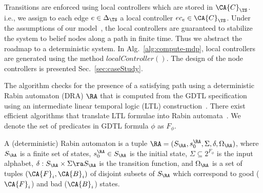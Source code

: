 Transitions are enforced using local controllers which are stored
in $\CA{C}_\TS$. i.e., we assign to each edge
$e \in \Delta_\TS$ a local controller $ec_e \in \CA{C}_\TS$.
Under the assumptions of our model~\cite{Agha14}, the local controllers
are guaranteed to stabilize the system to belief nodes along a path in finite time.
Thus we abstract the roadmap to a deterministic system.
In Alg.~\ref{alg:compute-mdp}, local controllers are generated
using the method $localController()$.
The design of the node controllers is presented Sec.~\ref{sec:caseStudy}. 

The algorithm checks for the presence of a satisfying path using
a deterministic Rabin automaton (DRA) $\RA$ that is computed from
the GDTL specification using an intermediate linear temporal logic (LTL)
construction~\cite{JonesDTL2013}.
There exist efficient algorithms that translate LTL formulae into Rabin automata~\cite{klein2006}.
We denote the set of predicates in GDTL formula $\phi$ as $F_\phi$.

\begin{definition}
A (deterministic) Rabin automaton is a tuple $\RA = (S_\RA, s_0^\RA, \Sigma, \delta, \Omega_\RA)$, where %
$S_\RA$ is a finite set of states, $s_0^\RA \in S_\RA$ is the initial state,
$\Sigma\subseteq 2^{F_\phi}$ is the input alphabet,
$\delta : S_\RA \times \Sigma \ra S_\RA$ is the transition function, and
$\Omega_\RA$ is a set of tuples $(\CA{F}_i, \CA{B}_i)$ of disjoint subsets
of $S_\RA$ which correspond to good ($\CA{F}_i$) and bad ($\CA{B}_i$) states.
\end{definition}

